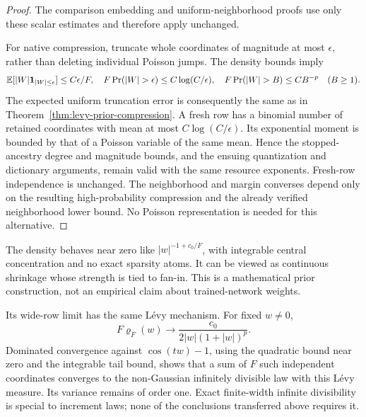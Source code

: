 \begin{proof}
The comparison embedding and uniform-neighborhood proofs use only these scalar estimates and therefore apply unchanged.

For native compression, truncate whole coordinates of magnitude at most $\epsilon$, rather than deleting individual Poisson jumps. The density bounds imply
\[
 \E[|W|\mathbf1_{|W|\le\epsilon}]\le C\epsilon/F,
 \quad F\Pr(|W|>\epsilon)\le C\log(C/\epsilon),
 \quad F\Pr(|W|>B)\le CB^{-p}\quad(B\ge1).
\]
The expected uniform truncation error is consequently the same as in Theorem~\ref{thm:levy-prior-compression}. A fresh row has a binomial number of retained coordinates with mean at most $C\log(C/\epsilon)$. Its exponential moment is bounded by that of a Poisson variable of the same mean. Hence the stopped-ancestry degree and magnitude bounds, and the ensuing quantization and dictionary arguments, remain valid with the same resource exponents. Fresh-row independence is unchanged. The neighborhood and margin converses depend only on the resulting high-probability compression and the already verified neighborhood lower bound. No Poisson representation is needed for this alternative.
\end{proof}

The density behaves near zero like $|w|^{-1+c_0/F}$, with integrable central concentration and no exact sparsity atoms. It can be viewed as continuous shrinkage whose strength is tied to fan-in. This is a mathematical prior construction, not an empirical claim about trained-network weights.

Its wide-row limit has the same L\'evy mechanism. For fixed $w\ne0$,
\[
 F\varrho_F(w)\longrightarrow
 \frac{c_0}{2|w|(1+|w|)^p}.
\]
Dominated convergence against $\cos(tw)-1$, using the quadratic bound near zero and the integrable tail bound, shows that a sum of $F$ such independent coordinates converges to the non-Gaussian infinitely divisible law with this L\'evy measure. Its variance remains of order one. Exact finite-width infinite divisibility is special to increment laws; none of the conclusions transferred above requires it.
